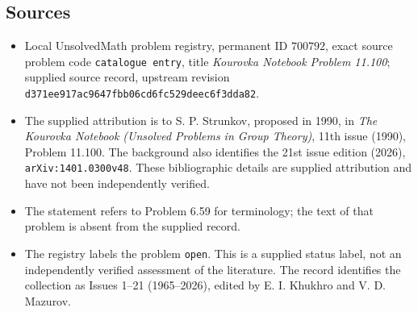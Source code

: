 \documentclass[11pt]{article}
\begin{document}
\subsection{Sources}
\begin{itemize}
\item Local UnsolvedMath problem registry, permanent ID \(700792\), exact source problem code \texttt{catalogue entry}, title \emph{Kourovka Notebook Problem 11.100}; supplied source record, upstream revision \texttt{d371ee917ac9647fbb06cd6fc529deec6f3dda82}.
\item The supplied attribution is to S. P. Strunkov, proposed in 1990, in \emph{The Kourovka Notebook (Unsolved Problems in Group Theory)}, 11th issue (1990), Problem 11.100. The background also identifies the 21st issue edition (2026), \texttt{arXiv:1401.0300v48}. These bibliographic details are supplied attribution and have not been independently verified.
\item The statement refers to Problem 6.59 for terminology; the text of that problem is absent from the supplied record.
\item The registry labels the problem \texttt{open}. This is a supplied status label, not an independently verified assessment of the literature. The record identifies the collection as Issues 1--21 (1965--2026), edited by E. I. Khukhro and V. D. Mazurov.
\end{itemize}
\end{document}
